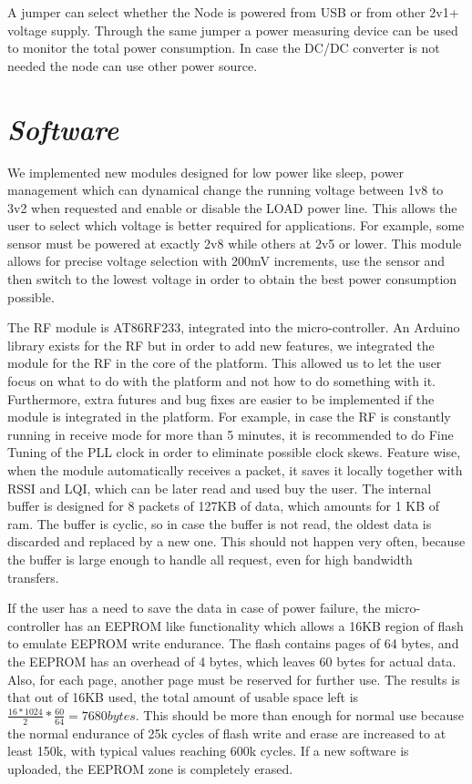 A jumper can select whether the Node is powered from USB or from other 2v1+ voltage supply. Through
the same jumper a power measuring device can be used to monitor the total power consumption. In case the DC/DC converter is not
needed the node can use other power source.

\section{\textit{Software}}

We implemented new modules designed for low power like sleep, power management which can dynamical
change the running voltage between 1v8 to 3v2 when requested and enable or disable the LOAD power
line. This allows the user to select which voltage is better required for applications. For example,
some sensor must be powered at exactly 2v8 while others at 2v5 or lower. This module allows for
precise voltage selection with 200mV increments, use the sensor and then switch to the lowest
voltage in order to obtain the best power consumption possible.

The RF module is AT86RF233, integrated into the micro-controller. An Arduino library
\cite{rf233}
exists for the RF but in order to add new features, we integrated the module for the RF in the core
of the platform. This allowed us to let the user focus on what to do with the platform and not how to do
something with it. Furthermore, extra futures and bug fixes are easier to be implemented if the module is
integrated in the platform. For example, in case the RF is constantly running in receive mode for
more than 5 minutes, it is recommended to do Fine Tuning of the PLL clock in order to eliminate
possible clock skews. Feature wise, when the module automatically receives a packet, it saves it
locally together with RSSI and LQI, which can be later read and used buy the user. The internal
buffer is designed for 8 packets of 127KB of data, which amounts for 1 KB of ram. The buffer is
cyclic, so in case the buffer is not read, the oldest data is discarded and replaced by a new one.
This should not happen very often, because the buffer is large enough to handle all request, even
for high bandwidth transfers.

If the user has a need to save the data in case of power failure, the micro-controller has an
EEPROM like functionality which allows a 16KB region of flash to emulate EEPROM write endurance.
The flash contains pages of 64 bytes, and the EEPROM has an overhead of 4 bytes, which leaves 60
bytes for actual data. Also, for each page, another page must be reserved for further use.
The results is that out of 16KB used, the total amount of usable space left is $\frac{16*1024}{2}
* \frac{60}{64} = 7680 bytes$. This should be more than enough for normal use because the normal
endurance of 25k cycles of flash write and erase are increased to at least 150k, with typical
values reaching 600k cycles. If a new software is uploaded, the EEPROM zone is completely erased.

